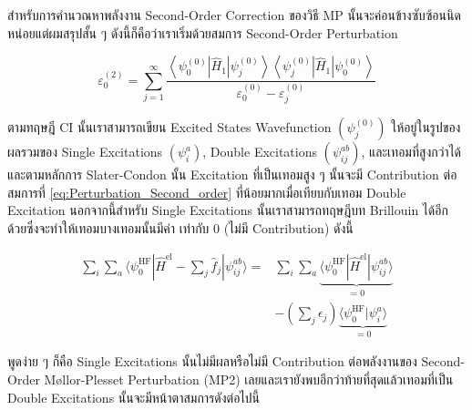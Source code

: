 สำหรับการคำนวณหาพลังงาน Second-Order Correction ของวิธี MP นั้นจะค่อนข้างซับซ้อนนิดหน่อยแต่ผมสรุปสั้น ๆ ดังนี้ก็คือว่าเราเริ่มด้วยสมการ
Second-Order Perturbation

\begin{equation}
  \label{eq:Perturbation_Second_order}
  \varepsilon_{0}^{(2)}
  =
  \sum_{j=1}^{\infty}
  \frac
  {
    \left\langle
    \psi_{0}^{(0)} \left|\hat{H}_{1}\right| \psi_{j}^{(0)}
    \right\rangle
    \left\langle
    \psi_{j}^{(0)} \left|\hat{H}_{1}\right| \psi_{0}^{(0)}
    \right\rangle
  }
  {
    \varepsilon_{0}^{(0)}-\varepsilon_{j}^{(0)}
  }
\end{equation}

\noindent ตามทฤษฎี CI นั้นเราสามารถเขียน Excited States Wavefunction $(\psi_{j}^{(0)})$ ให้อยู่ในรูปของผลรวมของ Single
Excitations $(\psi_{i}^{a})$, Double Excitations $(\psi_{i j}^{a b})$, และเทอมที่สูงกว่าได้ และตามหลักการ Slater-Condon
นั้น Excitation ที่เป็นเทอมสูง ๆ นั้นจะมี Contribution ต่อสมการที่ \eqref{eq:Perturbation_Second_order} ที่น้อยมากเมื่อเทียบกับเทอม
Double Excitation นอกจากนี้สำหรับ Single Excitations นั้นเราสามารถทฤษฎีบท Brillouin ได้อีกด้วยซึ่งจะทำให้เทอมบางเทอมนั้นมีค่า%
เท่ากับ 0 (ไม่มี Contribution) ดังนี้

\begin{equation}
  \begin{aligned}
    \sum_{i} \sum_{a}
    \langle\psi_{0}^{\mathrm{HF}} | \hat{H}^{\mathrm{el}}
    - \sum_{j} \hat{f}_{j} | \psi_{i j}^{a b}\rangle
    = & \sum_{i} \sum_{a}
    \underbrace{\langle\psi_{0}^{\mathrm{HF}}
    | \hat{H}^{\mathrm{el}} |
    \psi_{i j}^{a b}\rangle}_
    {= 0}                                      \\
      & - \left( \sum_{j} \epsilon_{j} \right)
    \underbrace{\langle\psi_{0}^{\mathrm{HF}} | \psi_{i}^{a} \rangle}_{= 0}
  \end{aligned}
\end{equation}

\noindent พูดง่าย ๆ ก็คือ Single Excitations นั้นไม่มีผลหรือไม่มี Contribution ต่อพลังงานของ Second-Order M\o{}llor-Plesset
Perturbation (MP2) เลยและเรายังพบอีกว่าท้ายที่สุดแล้วเทอมที่เป็น Double Excitations นั้นจะมีหน้าตาสมการดังต่อไปนี้

